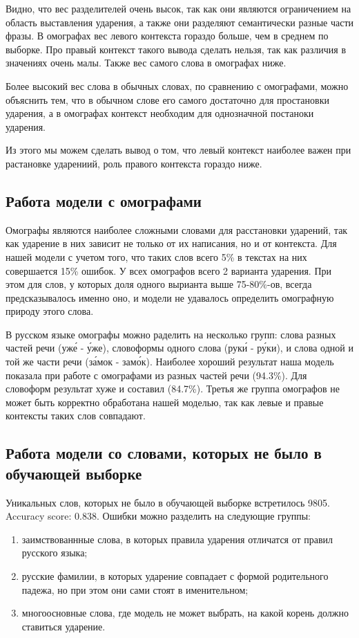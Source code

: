 \documentclass[14pt, a4paper, russian]{extreport}
\begin{document}
Видно, что вес разделителей очень высок, так как они являются ограничением на область выставления ударения, а также они разделяют семантически разные части фразы. В омографах вес левого контекста гораздо больше, чем в среднем по выборке. Про правый контекст такого вывода сделать нельзя, так как различия в значениях очень малы. Также вес самого слова в омографах ниже. 

Более высокий  вес слова  в обычных словах, по сравнению с омографами, можно объяснить тем, что в обычном слове его самого достаточно для простановки ударения, а в омографах контекст необходим для однозначной постаноки ударения.

Из этого мы можем сделать вывод о том, что левый контекст наиболее важен при растановке ударениий, роль правого контекста гораздо ниже.

\subsection{Работа модели с омографами}
Омографы являются наиболее сложными словами для расстановки ударений, так как ударение в них зависит не только от их написания, но и от контекста.  Для нашей модели с учетом того, что таких слов всего 5\% в текстах на них совершается 15\% ошибок.  У всех омографов всего 2 варианта ударения. При этом для слов, у которых доля одного вырианта выше 75-80\%-ов, всегда предсказывалось именно оно, и модели не удавалось определить омографную природу этого слова.  

В русском языке омографы можно раделить на несколько групп: слова разных частей речи (уж\'{е} - \'{у}же), словоформы одного слова (рук\'{и} - р\'{у}ки), и слова одной и той же части речи (з\'{а}мок - зам\'{о}к). Наиболее хороший результат наша модель показала при работе с омографами из разных частей речи (94.3\%). Для словоформ результат хуже и составил (84.7\%). Третья же группа омографов не может быть корректно обработана нашей моделью, так как левые и правые контексты таких слов совпадают.
\subsection{Работа модели со словами, которых не было в обучающей выборке}
Уникальных слов, которых не было в обучающей выборке встретилось 9805. Accuracy score: 0.838. Ошибки можно разделить на следующие группы: 
\begin{enumerate}[  1{)} ]
	\item заимствованнные слова, в которых правила ударения отличатся от правил русского языка;
	\item русские фамилии, в которых ударение совпадает с формой родительного падежа, но при этом они сами стоят в именительном;
	\item многоосновные слова, где модель не может выбрать, на какой корень должно ставиться ударение.
\end{enumerate}
\end{document}
